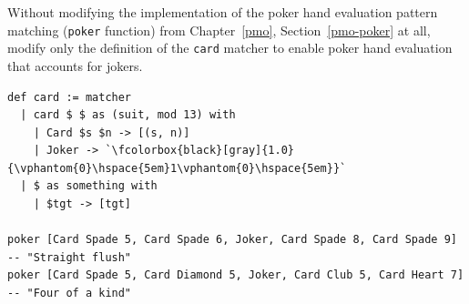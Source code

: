 Without modifying the implementation of the poker hand evaluation pattern matching (\lstinline{poker} function) from Chapter~\ref{pmo}, Section~\ref{pmo-poker} at all, modify only the definition of the \lstinline{card} matcher to enable poker hand evaluation that accounts for jokers.
\begin{lstlisting}[language=egison]
def card := matcher
  | card $ $ as (suit, mod 13) with 
    | Card $s $n -> [(s, n)]
    | Joker -> `\fcolorbox{black}[gray]{1.0}{\vphantom{0}\hspace{5em}1\vphantom{0}\hspace{5em}}`
  | $ as something with
    | $tgt -> [tgt]

poker [Card Spade 5, Card Spade 6, Joker, Card Spade 8, Card Spade 9]
-- "Straight flush"
poker [Card Spade 5, Card Diamond 5, Joker, Card Club 5, Card Heart 7]
-- "Four of a kind"
\end{lstlisting}
